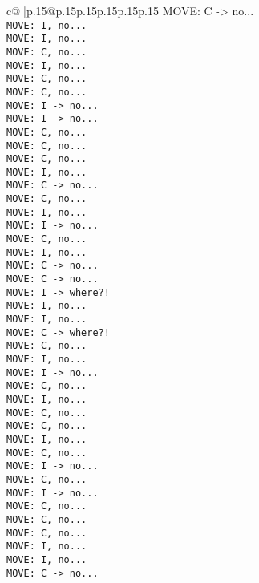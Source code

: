 \documentclass{article}
\begin{document}
{\begin{supertabular}{c@{$\;$}|p{.15\linewidth}@{}p{.15\linewidth}p{.15\linewidth}p{.15\linewidth}p{.15\linewidth}p{.15\linewidth}}
{{{MOVE: C -> no...\\ \tt  MOVE: I, no...\\ \tt  MOVE: I, no...\\ \tt  MOVE: C, no...\\ \tt  MOVE: I, no...\\ \tt  MOVE: C, no...\\ \tt  MOVE: C, no...\\ \tt  MOVE: I -> no...\\ \tt  MOVE: I -> no...\\ \tt  MOVE: C, no...\\ \tt  MOVE: C, no...\\ \tt  MOVE: C, no...\\ \tt  MOVE: I, no...\\ \tt  MOVE: C -> no...\\ \tt  MOVE: C, no...\\ \tt  MOVE: I, no...\\ \tt  MOVE: I -> no...\\ \tt  MOVE: C, no...\\ \tt  MOVE: I, no...\\ \tt  MOVE: C -> no...\\ \tt  MOVE: C -> no...\\ \tt  MOVE: I -> where?!\\ \tt  MOVE: I, no...\\ \tt  MOVE: I, no...\\ \tt  MOVE: C -> where?!\\ \tt  MOVE: C, no...\\ \tt  MOVE: I, no...\\ \tt  MOVE: I -> no...\\ \tt  MOVE: C, no...\\ \tt  MOVE: I, no...\\ \tt  MOVE: C, no...\\ \tt  MOVE: C, no...\\ \tt  MOVE: I, no...\\ \tt  MOVE: C, no...\\ \tt  MOVE: I -> no...\\ \tt  MOVE: C, no...\\ \tt  MOVE: I -> no...\\ \tt  MOVE: C, no...\\ \tt  MOVE: C, no...\\ \tt  MOVE: C, no...\\ \tt  MOVE: I, no...\\ \tt  MOVE: I, no...\\ \tt  MOVE: C -> no...\\ \tt  }}}
\end{supertabular}}
\end{document}
